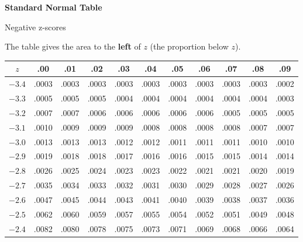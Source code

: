 \documentclass[11pt]{article}
\begin{document}
\begin{center}
{\Large\bfseries Standard Normal Table}\par\vspace{0.3em}
Negative z-scores\par\vspace{0.5em}
\par\vspace{0.3em}
{\small The table gives the area to the \textbf{left} of $z$ (the proportion below $z$).}
\par\vspace{0.5em}
\renewcommand{\arraystretch}{1.07}
\setlength{\tabcolsep}{4.6pt}
{\small
\begin{tabular}{|c|cccccccccc|}\hline
$z$ & .00 & .01 & .02 & .03 & .04 & .05 & .06 & .07 & .08 & .09 \\ \hline
$-3.4$ & .0003 & .0003 & .0003 & .0003 & .0003 & .0003 & .0003 & .0003 & .0003 & .0002 \\
$-3.3$ & .0005 & .0005 & .0005 & .0004 & .0004 & .0004 & .0004 & .0004 & .0004 & .0003 \\
$-3.2$ & .0007 & .0007 & .0006 & .0006 & .0006 & .0006 & .0006 & .0005 & .0005 & .0005 \\
$-3.1$ & .0010 & .0009 & .0009 & .0009 & .0008 & .0008 & .0008 & .0008 & .0007 & .0007 \\
$-3.0$ & .0013 & .0013 & .0013 & .0012 & .0012 & .0011 & .0011 & .0011 & .0010 & .0010 \\
\hline
$-2.9$ & .0019 & .0018 & .0018 & .0017 & .0016 & .0016 & .0015 & .0015 & .0014 & .0014 \\
$-2.8$ & .0026 & .0025 & .0024 & .0023 & .0023 & .0022 & .0021 & .0021 & .0020 & .0019 \\
$-2.7$ & .0035 & .0034 & .0033 & .0032 & .0031 & .0030 & .0029 & .0028 & .0027 & .0026 \\
$-2.6$ & .0047 & .0045 & .0044 & .0043 & .0041 & .0040 & .0039 & .0038 & .0037 & .0036 \\
$-2.5$ & .0062 & .0060 & .0059 & .0057 & .0055 & .0054 & .0052 & .0051 & .0049 & .0048 \\
\hline
$-2.4$ & .0082 & .0080 & .0078 & .0075 & .0073 & .0071 & .0069 & .0068 & .0066 & .0064 \\

\end{tabular}}
\end{center}
\end{document}

